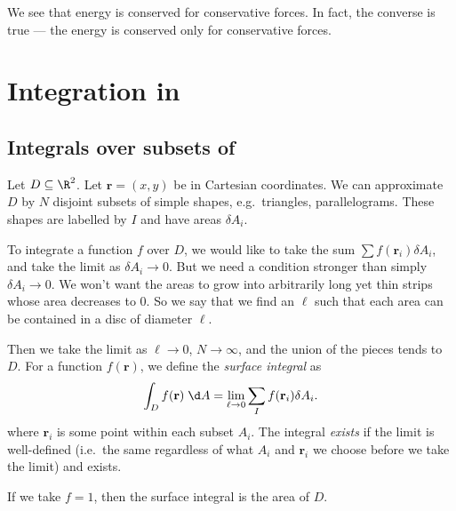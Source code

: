 \documentclass[a4paper]{article}
\begin{document}
We see that energy is conserved for conservative forces. In fact, the converse is true --- the energy is conserved only for conservative forces.

\section{Integration in }
\subsection{Integrals over subsets of }
\begin{defi}
  Let $D\subseteq \R^2$. Let $\mathbf{r} = (x, y)$ be in Cartesian coordinates. We can approximate $D$ by $N$ disjoint subsets of simple shapes, e.g.\ triangles, parallelograms. These shapes are labelled by $I$ and have areas $\delta A_i$. \begin{center}
  \end{center}
  To integrate a function $f$ over $D$, we would like to take the sum $\sum f(\mathbf{r}_i) \delta A_i$, and take the limit as $\delta A_i \to 0$. But we need a condition stronger than simply $\delta A_i \to 0$. We won't want the areas to grow into arbitrarily long yet thin strips whose area decreases to 0. So we say that we find an $\ell$ such that each area can be contained in a disc of diameter $\ell$.

  Then we take the limit as $\ell \to 0$, $N\to \infty$, and the union of the pieces tends to $D$. For a function $f(\mathbf{r})$, we define the \emph{surface integral} as
  \[
    \int_D f(\mathbf{r}) \;\d A = \lim_{\ell\to 0}\sum _I f(\mathbf{r}_i)\delta A_i.
  \]
  where $\mathbf{r}_i$ is some point within each subset $A_i$. The integral \emph{exists} if the limit is well-defined (i.e.\ the same regardless of what $A_i$ and $\mathbf{r}_i$ we choose before we take the limit) and exists.
\end{defi}
If we take $f = 1$, then the surface integral is the area of $D$.
\end{document}
